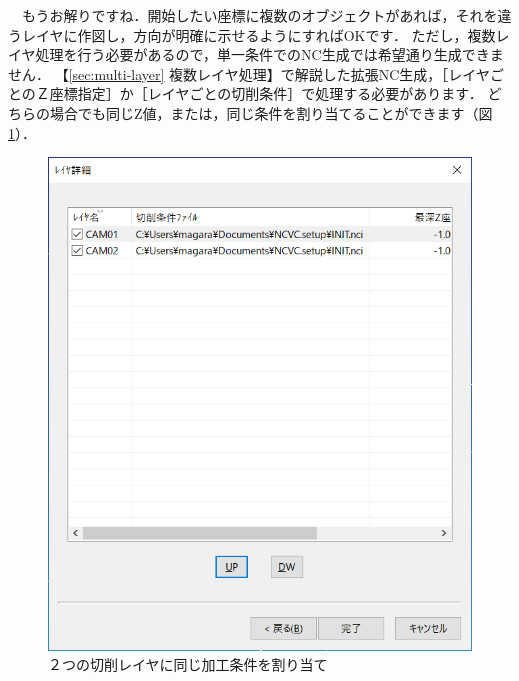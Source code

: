 \begin{minipage}[t]{0.5\textwidth}
　もうお解りですね．開始したい座標に複数のオブジェクトがあれば，それを違うレイヤに作図し，方向が明確に示せるようにすればOKです．
ただし，複数レイヤ処理を行う必要があるので，単一条件でのNC生成では希望通り生成できません．
【\ref{sec:multi-layer} 複数レイヤ処理】で解説した拡張NC生成，［レイヤごとのＺ座標指定］か［レイヤごとの切削条件］で処理する必要があります．
どちらの場合でも同じZ値，または，同じ条件を割り当てることができます（図\ref{fig:direction-setup}）．
\end{minipage}
\begin{minipage}[t]{0.5\textwidth}
\vspace*{-2zh}
\begin{figure}[H]
\centering
\includegraphics[scale=0.6]{No4/fig/direction-setup.png}
\caption{２つの切削レイヤに同じ加工条件を割り当て}
\label{fig:direction-setup}
\end{figure}
\end{minipage}

